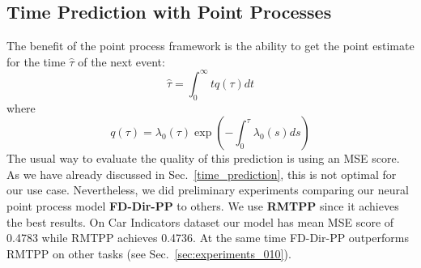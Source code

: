 \subsection{Time Prediction with Point Processes}\label{time_mse}

The benefit of the point process framework is the ability to get the point estimate for the time $\hat{\tau}$ of the next event:
\begin{equation}
    \hat{\tau} = \int_0^\infty t q(\tau) dt
\end{equation}
where
\begin{equation}
q(\tau) = \lambda_0(\tau) \exp\left( -\int_0^{\tau} \lambda_0(s) ds \right)
\end{equation}
The usual way to evaluate the quality of this prediction is using an MSE score. As we have already discussed in Sec.\ \ref{time_prediction}, this is not optimal for our use case. Nevertheless, we did preliminary experiments comparing our neural point process model \textbf{FD-Dir-PP} to others. We use \textbf{RMTPP} \cite{RMTPP} since it achieves the best results. On Car Indicators dataset our model has mean MSE score of 0.4783 while RMTPP achieves 0.4736. At the same time FD-Dir-PP outperforms RMTPP on other tasks (see Sec.\ \ref{sec:experiments_010}).
